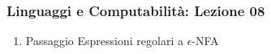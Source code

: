 




\begin{frame}[fragile]
	\frametitle{Linguaggi e Computabilità: Lezione 08}
\begin{enumerate}
\item
Passaggio Espressioni regolari a $\epsilon$-NFA
\end{enumerate}
\end{frame}



